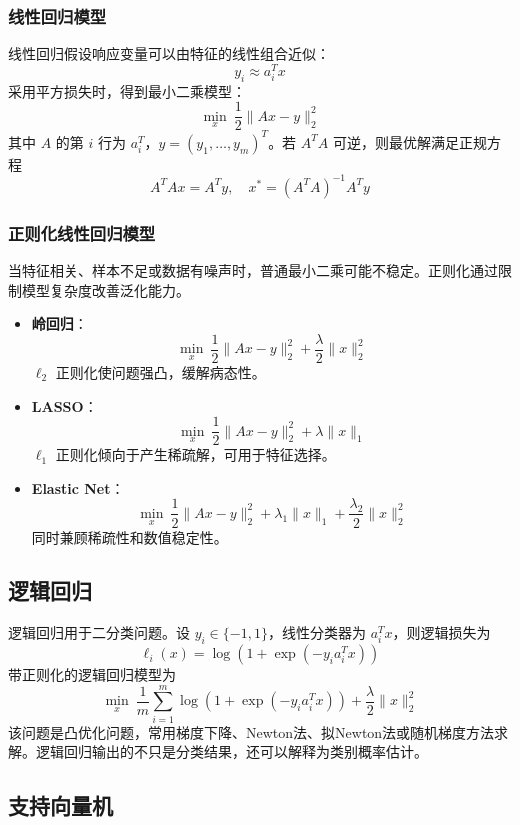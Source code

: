 \subsubsection{线性回归模型}

线性回归假设响应变量可以由特征的线性组合近似：
\[
y_i \approx a_i^T x
\]
采用平方损失时，得到最小二乘模型：
\[
\min_x\ \frac{1}{2}\|Ax-y\|_2^2
\]
其中 $A$ 的第 $i$ 行为 $a_i^T$，$y=(y_1,\ldots,y_m)^T$。若 $A^T A$ 可逆，则最优解满足正规方程
\[
A^T A x = A^T y,\quad x^*=(A^T A)^{-1}A^T y
\]

\subsubsection{正则化线性回归模型}

当特征相关、样本不足或数据有噪声时，普通最小二乘可能不稳定。正则化通过限制模型复杂度改善泛化能力。

\begin{conceptbox}[常见正则化回归]
\begin{itemize}[itemsep=0.3em]
    \item \textbf{岭回归}：
    \[
    \min_x\ \frac{1}{2}\|Ax-y\|_2^2 + \frac{\lambda}{2}\|x\|_2^2
    \]
    $\ell_2$ 正则化使问题强凸，缓解病态性。
    \item \textbf{LASSO}：
    \[
    \min_x\ \frac{1}{2}\|Ax-y\|_2^2 + \lambda\|x\|_1
    \]
    $\ell_1$ 正则化倾向于产生稀疏解，可用于特征选择。
    \item \textbf{Elastic Net}：
    \[
    \min_x\ \frac{1}{2}\|Ax-y\|_2^2 + \lambda_1\|x\|_1+\frac{\lambda_2}{2}\|x\|_2^2
    \]
    同时兼顾稀疏性和数值稳定性。
\end{itemize}
\end{conceptbox}

\subsection{逻辑回归}

逻辑回归用于二分类问题。设 $y_i\in\{-1,1\}$，线性分类器为 $a_i^T x$，则逻辑损失为
\[
\ell_i(x)=\log\left(1+\exp(-y_i a_i^T x)\right)
\]
带正则化的逻辑回归模型为
\[
\min_x\ \frac{1}{m}\sum_{i=1}^{m}\log\left(1+\exp(-y_i a_i^T x)\right)
+\frac{\lambda}{2}\|x\|_2^2
\]
该问题是凸优化问题，常用梯度下降、Newton法、拟Newton法或随机梯度方法求解。逻辑回归输出的不只是分类结果，还可以解释为类别概率估计。

\subsection{支持向量机}

